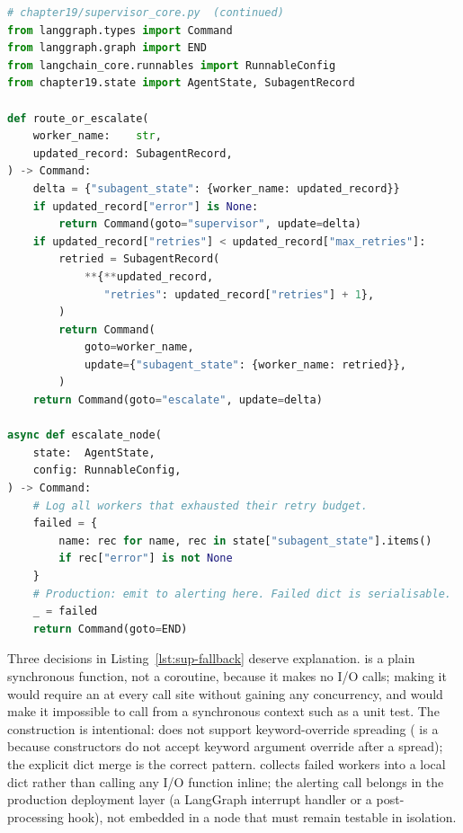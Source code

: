 \begin{lstlisting}[language=Python,
  caption={Per-worker retry logic as a pure function},
  label={lst:sup-fallback}]
# chapter19/supervisor_core.py  (continued)
from langgraph.types import Command
from langgraph.graph import END
from langchain_core.runnables import RunnableConfig
from chapter19.state import AgentState, SubagentRecord

def route_or_escalate(
    worker_name:    str,
    updated_record: SubagentRecord,
) -> Command:
    delta = {"subagent_state": {worker_name: updated_record}}
    if updated_record["error"] is None:
        return Command(goto="supervisor", update=delta)
    if updated_record["retries"] < updated_record["max_retries"]:
        retried = SubagentRecord(
            **{**updated_record,
               "retries": updated_record["retries"] + 1},
        )
        return Command(
            goto=worker_name,
            update={"subagent_state": {worker_name: retried}},
        )
    return Command(goto="escalate", update=delta)

async def escalate_node(
    state:  AgentState,
    config: RunnableConfig,
) -> Command:
    # Log all workers that exhausted their retry budget.
    failed = {
        name: rec for name, rec in state["subagent_state"].items()
        if rec["error"] is not None
    }
    # Production: emit to alerting here. Failed dict is serialisable.
    _ = failed
    return Command(goto=END)
\end{lstlisting}

Three decisions in Listing~\ref{lst:sup-fallback} deserve explanation.
 is a plain synchronous function, not a
coroutine, because it makes no I/O calls; making it  would
require an  at every call site without gaining any concurrency,
and would make it impossible to call from a synchronous context such as a
unit test. The 
construction is intentional:  does not support
keyword-override spreading ( is a
 because  constructors do not accept
keyword argument override after a spread); the explicit dict merge
 is the correct pattern.
 collects failed workers into a local dict rather
than calling any I/O function inline; the alerting call belongs in the
production deployment layer (a LangGraph interrupt handler or a
post-processing hook), not embedded in a node that must remain testable
in isolation.

